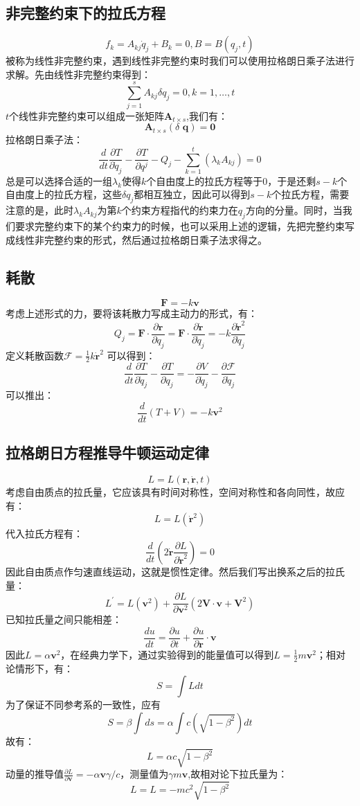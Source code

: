 \documentclass[a4paper, 10pt, openany]{book}%
\begin{document}
    \subsection{非完整约束下的拉氏方程}
    $$f_k=A_{kj}\dot{q}_j+B_k=0,B=B(q_j,t)$$
    被称为线性非完整约束，遇到线性非完整约束时我们可以使用拉格朗日乘子法进行求解。先由线性非完整约束得到：
    $$\sum_{j=1}^s A_{kj}\delta q_j=0,k=1,\dots,t$$
    $t$个线性非完整约束可以组成一张矩阵$\textbf{A}_{t\times s}$,我们有：
    $$\textbf{A}_{t\times s}(\delta\textbf{ q})=\textbf{0}$$
    拉格朗日乘子法：
    $$\frac{d}{dt}\frac{\partial T}{\partial \dot{q}_j}-\frac{\partial T}{\partial q^j}-Q_j-\sum_{k=1}^t(\lambda_kA_{kj})=0$$
    总是可以选择合适的一组$\lambda_k$使得$k$个自由度上的拉氏方程等于0，于是还剩$s-k$个自由度上的拉氏方程，这些$\delta q_j$都相互独立，因此可以得到$s-k$个拉氏方程，需要注意的是，此时$\lambda_kA_{kj}$为第$k$个约束方程指代的约束力在$q_j$方向的分量。同时，当我们要求完整约束下的某个约束力的时候，也可以采用上述的逻辑，先把完整约束写成线性非完整约束的形式，然后通过拉格朗日乘子法求得之。
     \subsection{耗散}
    $$\textbf{F}=-k\textbf{v}$$
    考虑上述形式的力，要将该耗散力写成主动力的形式，有：
     $$Q_j=\textbf{F}\cdot\frac{\partial \textbf{r}}{\partial q_j}=\textbf{F}\cdot\frac{\partial \dot{\textbf{r}}}{\partial \dot{q}_j}=-k\frac{\partial \dot{\textbf{r}}^2}{\partial \dot{q}_j}$$
    定义耗散函数$\mathcal{F}=\frac{1}{2}k\dot{\textbf{r}}^2$  可以得到：
    $$\frac{d}{dt}\frac{\partial T}{\partial \dot{q}_j}-\frac{\partial T}{\partial q_j}=-\frac{\partial V}{\partial \dot{q}_j}-\frac{\partial \mathcal{F}}{\partial \dot{q}_j}$$
    可以推出：
    $$\frac{d}{dt}(T+V)=-k\textbf{v}^2$$
    \subsection{拉格朗日方程推导牛顿运动定律}
    $$L=L(\textbf{r},\dot{\textbf{r}},t)$$
    考虑自由质点的拉氏量，它应该具有时间对称性，空间对称性和各向同性，故应有：
    $$L=L(\dot{\textbf{r}}^2)$$
    代入拉氏方程有：
    $$\frac{d}{dt}(2\dot{\textbf{r}}\frac{\partial L}{\partial \dot{\textbf{r}}^2})=0$$
    因此自由质点作匀速直线运动，这就是惯性定律。然后我们写出换系之后的拉氏量：
    $$L^\prime=L(\textbf{v}^2)+\frac{\partial L}{\partial \textbf{v}^2}(2\textbf{V}\cdot\textbf{v}+\textbf{V}^2)$$
    已知拉氏量之间只能相差：
    $$\frac{du}{dt}=\frac{\partial u}{\partial t}+\frac{\partial u}{\partial \textbf{r}}\cdot\textbf{v}$$
    因此$L=\alpha\textbf{v}^2$，在经典力学下，通过实验得到的能量值可以得到$L=\frac{1}{2}m\textbf{v}^2$；相对论情形下，有：
    $$S=\int Ldt$$
    为了保证不同参考系的一致性，应有
    $$S=\beta\int ds=\alpha\int c(\sqrt{1-\beta^2})dt$$
    故有：
    $$L=\alpha c \sqrt{1-\beta^2}$$
    动量的推导值$\frac{\partial L}{\partial \textbf{v}}=-\alpha \textbf{v}\gamma/c$，测量值为$\gamma m \textbf{v}$,故相对论下拉氏量为：
    $$L=L=-m c^2 \sqrt{1-\beta^2}$$
\end{document}

